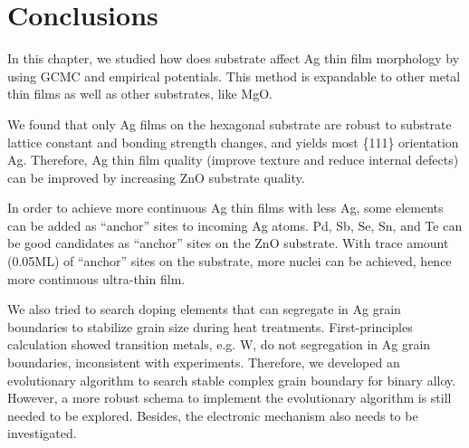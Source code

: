 \section{Conclusions}
In this chapter, we studied how does substrate affect Ag thin film morphology by using \ac{GCMC} and empirical potentials. This method is expandable to other metal thin films as well as other substrates, like MgO.

We found that only Ag films on the hexagonal substrate are robust to substrate lattice constant and bonding strength changes, and yields most \{111\} orientation Ag. Therefore, Ag thin film quality (improve texture and reduce internal defects) can be improved by increasing ZnO substrate quality. 

In order to achieve more continuous Ag thin films with less Ag, some elements can be added as ``anchor'' sites to incoming Ag atoms. Pd, Sb, Se, Sn, and Te can be good candidates as ``anchor'' sites on the ZnO substrate. With trace amount (0.05\ac{ML}) of ``anchor'' sites on the substrate, more nuclei can be achieved, hence more continuous ultra-thin film.

We also tried to search doping elements that can segregate in Ag grain boundaries to stabilize grain size during heat treatments. First-principles calculation showed transition metals, e.g. W, do not segregation in Ag grain boundaries, inconsistent with experiments. Therefore, we developed an evolutionary algorithm to search stable complex grain boundary for binary alloy. However, a more robust schema to implement the evolutionary algorithm is still needed to be explored. Besides, the electronic mechanism also needs to be investigated.